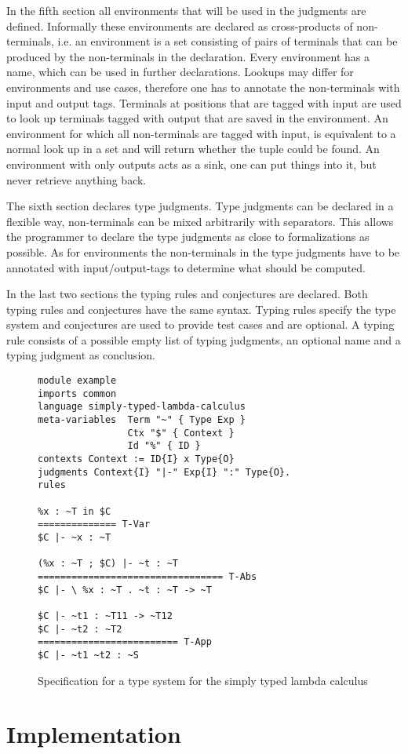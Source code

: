 In the fifth section all environments that will be used in the
judgments are defined. Informally these environments are declared as
cross-products of non-terminals, i.e. an environment is a set
consisting of pairs of terminals that can be produced by the
non-terminals in the declaration. Every environment has a name, which
can be used in further declarations. Lookups may differ for
environments and use cases, therefore one has to annotate the
non-terminals with input and output tags. Terminals at positions that
are tagged with input are used to look up terminals tagged with output
that are saved in the environment. An environment for which all
non-terminals are tagged with input, is equivalent to a normal look up
in a set and will return whether the tuple could be found. An
environment with only outputs acts as a sink, one can put things into
it, but never retrieve anything back.

The sixth section declares type judgments. Type judgments can be
declared in a flexible way, non-terminals can be mixed arbitrarily
with separators. This allows the programmer to declare the type judgments as close to formalizations as
possible. As for environments the non-terminals in the type judgments
have to be annotated with input/output-tags to determine what should
be computed.

In the last two sections the typing rules and conjectures are
declared. Both typing rules and conjectures have the same
syntax. Typing rules specify the type system and conjectures are used
to provide test cases and are optional. A typing rule consists of a possible empty list
of typing judgments, an optional name and a typing judgment as
conclusion.

\begin{figure}
\begin{verbatim}
module example
imports common
language simply-typed-lambda-calculus
meta-variables 	Term "~" { Type Exp }
                Ctx "$" { Context }
                Id "%" { ID }
contexts Context := ID{I} x Type{O}
judgments Context{I} "|-" Exp{I} ":" Type{O}.
rules

%x : ~T in $C
============== T-Var
$C |- ~x : ~T

(%x : ~T ; $C) |- ~t : ~T
================================= T-Abs
$C |- \ %x : ~T . ~t : ~T -> ~T

$C |- ~t1 : ~T11 -> ~T12
$C |- ~t2 : ~T2
========================= T-App
$C |- ~t1 ~t2 : ~S
\end{verbatim}
\caption{Specification for a type system for the simply typed lambda calculus}
\end{figure}
\section{Implementation}


